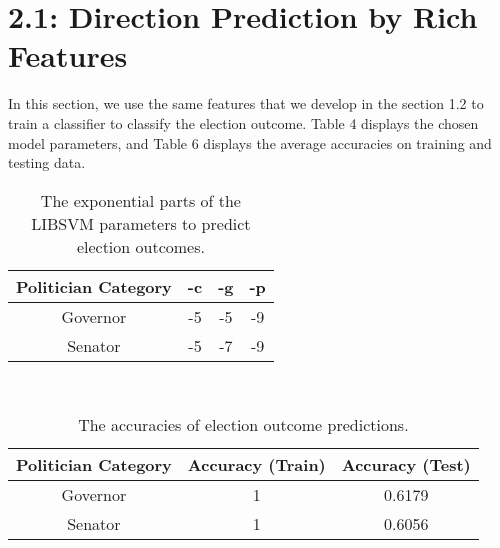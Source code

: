 \documentclass[10pt]{article}
\begin{document}
\section*{\small{2.1: Direction Prediction by Rich Features}}
	In this section, we use the same features that we develop in the section 1.2 to train a classifier to classify the election outcome. Table 4 displays the chosen model parameters, and Table 6 displays the average accuracies on training and testing data.\\
	\begin{table}[ht]
 		\centering
 		\begin{tabular}{|c|c|c|c|}
		\hline
		\textbf{Politician Category} & \textbf{-c} & \textbf{-g} & \textbf{-p} \\ \hline
		Governor & -5 & -5 & -9 \\ \hline
		Senator & -5 & -7 & -9 \\ \hline
 		\end{tabular}
		\caption{The exponential parts of the LIBSVM parameters to predict election outcomes.}\label{tab5}
	\end{table}\\
	\begin{table}[ht]
 		\centering
 		\begin{tabular}{|c|c|c|}
		\hline
		\textbf{Politician Category} & \textbf{Accuracy (Train)} & \textbf{Accuracy (Test)} \\ \hline
		Governor & 1 & 0.6179 \\ \hline
		Senator & 1 & 0.6056 \\ \hline
 		\end{tabular}
		\caption{The accuracies of election outcome predictions.}\label{tab6}
	\end{table}\\
\end{document}
